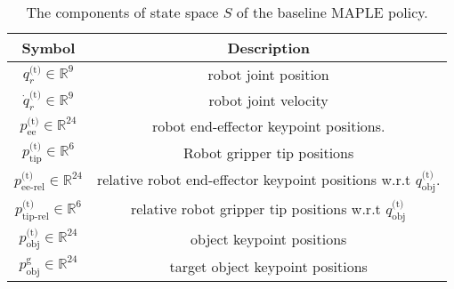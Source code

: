 \begin{table}[H]
\centering
\begin{tabular}{|c|c|}
\hline
 \textbf{Symbol} & \textbf{Description} \\ \hline
$q^\text{(t)}_r \in \mathbb{R}^9$ &robot joint position  \\ \hline

$\dot{q}^\text{(t)}_r \in \mathbb{R}^9$ &robot joint velocity  \\ \hline

$p^\text{(t)}_\text{ee} \in \mathbb{R}^{24}$ & robot end-effector keypoint positions. \\ \hline

$p^\text{(t)}_\text{tip} \in \mathbb{R}^6$ & Robot gripper tip positions \\ \hline

$p^\text{(t)}_\text{ee-rel} \in \mathbb{R}^{24}$ & \makecell{relative robot end-effector \\ keypoint positions w.r.t $q^\text{(t)}_\text{obj}$}. \\ \hline

$p^\text{(t)}_\text{tip-rel} \in \mathbb{R}^6$ & \makecell{relative robot gripper \\ tip positions  w.r.t $q^\text{(t)}_\text{obj}$} \\ \hline

$p^\text{(t)}_\text{obj} \in \mathbb{R}^{24}$ &object keypoint positions  \\ \hline

$p^\text{g}_\text{obj} \in \mathbb{R}^{24}$ &target object keypoint positions \\ 
\hline
\end{tabular}
\vspace{-0.2cm}
\caption{The components of state space $S$ of the baseline MAPLE policy.}\label{table:Maple_state}
\end{table}
